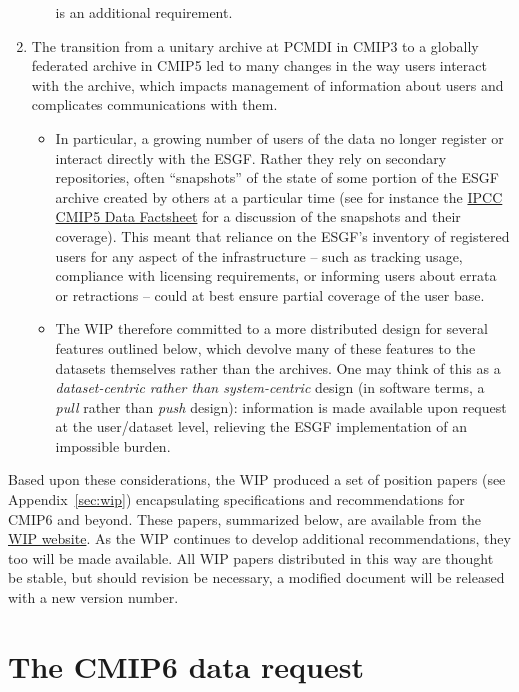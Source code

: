 \documentclass[gmd,manuscript]{copernicus}
\newcommand{\pipref}[1] {\citep{ref:#1}}
\newcommand{\appref}[1] {\mbox{Appendix \ref{sec:#1}}}
\begin{document}
\begin{enumerate}
\begin{itemize}
   \pipref{lawrenceetal2012} is an additional requirement.
  \end{itemize}
\item\label{snap} The transition from a unitary archive at PCMDI in
  CMIP3 to a globally federated archive in CMIP5 led to many changes
  in the way users interact with the archive, which impacts management
  of information about users and complicates communications with them.
  \begin{itemize}
  \item In particular, a growing number of users of the data no longer
    register or interact directly with the ESGF. Rather they rely on
    secondary repositories, often ``snapshots'' of the state of some
    portion of the ESGF archive created by others at a particular time
    (see for instance the \href{https://goo.gl/34AtW6}{IPCC CMIP5 Data
      Factsheet} for a discussion of the snapshots and their
    coverage). This meant that reliance on the ESGF's inventory of
    registered users for any aspect of the infrastructure -- such as
    tracking usage, compliance with licensing requirements, or
    informing users about errata or retractions -- could at best
    ensure partial coverage of the user base.
  \item The WIP therefore committed to a more distributed design for
    several features outlined below, which devolve many of these
    features to the datasets themselves rather than the archives. One
    may think of this as a \emph{dataset-centric rather than
      system-centric} design (in software terms, a \emph{pull} rather
    than \emph{push} design): information is made available upon
    request at the user/dataset level, relieving the ESGF
    implementation of an impossible burden.
  \end{itemize}
\end{enumerate}

Based upon these considerations, the WIP produced a set of position
papers (see \appref{wip}) encapsulating specifications and
recommendations for CMIP6 and beyond. These papers, summarized below,
are available from the
\href{https://www.earthsystemcog.org/projects/wip/}{WIP website}. As
the WIP continues to develop additional recommendations, they too will
be made available. All WIP papers distributed in this way are thought
be stable, but should revision be necessary, a modified document will
be released with a new version number.

\section{The CMIP6 data request}
\label{sec:dreq}
\end{document}
